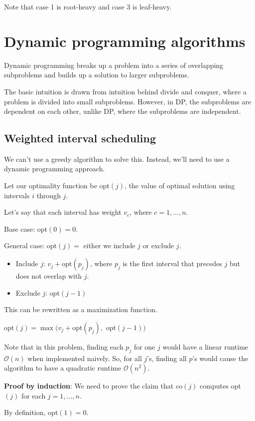 \documentclass{article}
\newcommand{\Oh}{\mathcal{O}}
\begin{document}
Note that case 1 is root-heavy and case 3 is leaf-heavy.

\section{Dynamic programming algorithms}
Dynamic programming breaks up a problem into a series of overlapping subproblems and builds up a solution to larger subproblems.

The basic intuition is drawn from intuition behind divide and conquer, where a problem is divided into small subproblems. However, in DP, the subproblems are dependent on each other, unlike DP, where the subproblems are independent.

\subsection{Weighted interval scheduling}
We can't use a greedy algorithm to solve this. Instead, we'll need to use a dynamic programming approach.

Let our optimality function be {\sc opt}$(j)$, the value of optimal solution using intervals $i$ through $j$.

Let's say that each interval has weight $v_c$, where $c = 1, \dots, n$.

Base case: {\sc opt}$(0) = 0$.

General case: {\sc opt}$(j) = $ either we include $j$ or exclude $j$.
\begin{itemize}
    \item Include $j$: $v_j + ${\sc opt}$(p_j)$, where $p_j$ is the first interval that precedes $j$ but does not overlap with $j$.
    \item Exclude $j$: {\sc opt}$(j - 1)$
\end{itemize}

This can be rewritten as a maximization function.

{\sc opt}$(j) = \max(v_j + ${\sc opt}$(p_j),$ {\sc opt}$(j - 1))$

Note that in this problem, finding each $p_j$ for one $j$ would have a linear runtime $\Oh(n)$ when implemented naively. So, for all $j$'s, finding all $p$'s would cause the algorithm to have a quadratic runtime $\Oh(n^2)$.

\textbf{Proof by induction}: We need to prove the claim that {\sc co}$(j)$ computes {\sc opt}$(j)$ for each $j = 1, \dots, n$.

By definition, {\sc opt}$(1) = 0$.
\end{document}
